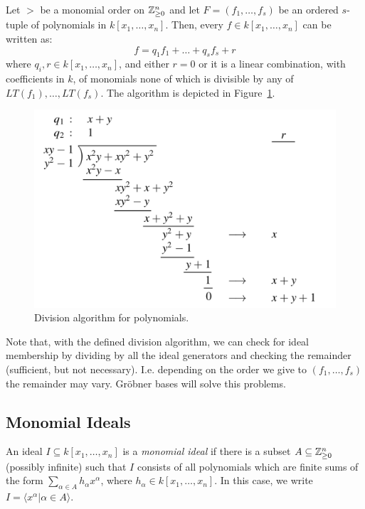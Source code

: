 \begin{theorem}
    Let $>$ be a monomial order on $\mathbb{Z}^n_{\geq 0}$ and let $F = (f_1, \dots, f_s)$ be an ordered $s$-tuple of polynomials in $k[x_1, \dots, x_n]$.
    Then, every $f \in k[x_1, \dots, x_n]$ can be written as:
    $$f = q_1f_1 + \dots + q_sf_s + r$$
    where $q_i, r \in k[x_1, \dots, x_n]$, and either $r = 0$ or it is a linear combination, with coefficients in $k$, of monomials none of which is divisible by any of $LT(f_1), \dots, LT(f_s)$.
    The algorithm is depicted in Figure~\ref{fig:division-algorithm}.
\end{theorem}
\begin{figure}[h!]
    \centering
    \includegraphics[width=.6\textwidth]{img/division.png}
    \caption{Division algorithm for polynomials.\label{fig:division-algorithm}}
\end{figure}

Note that, with the defined division algorithm, we can check for ideal membership by dividing by all the ideal generators and checking the remainder (sufficient, but not necessary). I.e. depending on the order we give to $(f_1, \dots, f_s)$ the remainder may vary.
Gr\"obner bases will solve this problems.

\subsection{Monomial Ideals}

\begin{definition}
    An ideal $I \subseteq k[x_1, \dots, x_n]$ is a \textit{monomial ideal} if there is a subset $A \subseteq \mathbb{Z}^n_{\geq 0}$ (possibly infinite) such that $I$ consists of all polynomials which are finite sums of the form $\sum_{\alpha \in A} h_{\alpha}x^{\alpha}$, where $h_{\alpha} \in k[x_1, \dots, x_n]$. In this case, we write $I = \langle x^{\alpha} | \alpha \in A \rangle$.
\end{definition}

